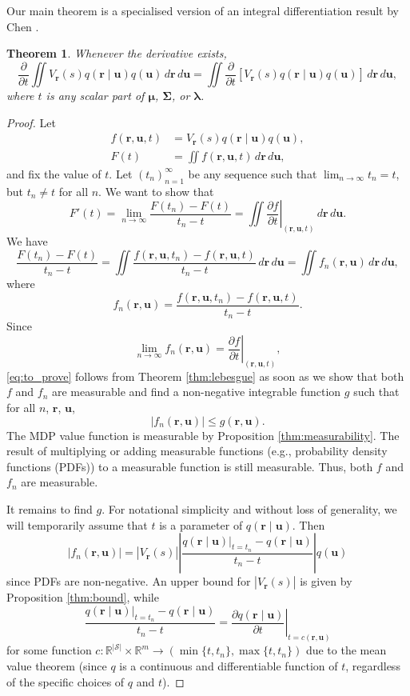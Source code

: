 \documentclass{article}
\newtheorem{theorem}{Theorem}[section]
\theoremstyle{definition}
\theoremstyle{remark}
\newcommand{\V}{V_{\mathbf{r}}}
\newcommand{\dt}{\frac{\partial}{\partial t}}
\newcommand{\f}{f(\mathbf{r}, \mathbf{u}, t)}
\newcommand{\ftn}{f(\mathbf{r}, \mathbf{u}, t_n)}
\newcommand{\fn}{f_n(\mathbf{r}, \mathbf{u})}
\newcommand{\dx}{\,d\mathbf{r}\,d\mathbf{u}}
\newcommand{\df}{\left.\frac{\partial f}{\partial t}\right|_{(\mathbf{r},
    \mathbf{u}, t)}}
\newcommand{\g}{g(\mathbf{r}, \mathbf{u})}
\begin{document}
Our main theorem is a specialised version of an integral differentiation result
by Chen \cite{lecture_notes}.
\begin{theorem} \label{thm:main}
  Whenever the derivative exists,
  \[
    \dt\iint
    \V(s)q(\mathbf{r} \mid \mathbf{u})q(\mathbf{u})\dx
    = \iint
    \dt[\V(s)q(\mathbf{r} \mid \mathbf{u})q(\mathbf{u})]\dx,
  \]
  where $t$ is any scalar part of $\bm\mu$, $\bm\Sigma$, or $\bm\lambda$.
\end{theorem}
\begin{proof}
  Let
  \begin{align*}
    \f &= \V(s)q(\mathbf{r} \mid \mathbf{u})q(\mathbf{u}), \\
    F(t) &= \iint \f\dx,
  \end{align*}
  and fix the value of $t$. Let $(t_n)_{n=1}^\infty$ be any sequence such that
  $\lim_{n \to \infty} t_n = t$, but $t_n \ne t$ for all $n$. We want to show
  that
  \begin{equation} \label{eq:to_prove}
    F'(t) = \lim_{n \to \infty} \frac{F(t_n) - F(t)}{t_n - t} = \iint \df\dx.
  \end{equation}
  We have
  \[
    \frac{F(t_n) - F(t)}{t_n - t} = \iint \frac{\ftn - \f}{t_n - t}\dx =
    \iint \fn\dx,
  \]
  where
  \[
    \fn = \frac{\ftn - \f}{t_n - t}.
  \]
  Since
  \[
    \lim_{n \to \infty} \fn = \df,
  \]
  \eqref{eq:to_prove} follows from Theorem \ref{thm:lebesgue} as soon as we show
  that both $f$ and $f_n$ are measurable and find a non-negative integrable
  function $g$ such that for all $n$, $\mathbf{r}$, $\mathbf{u}$,
  \[
    |\fn| \le \g.
  \]
  The MDP value function is measurable by Proposition \ref{thm:measurability}.
  The result of multiplying or adding measurable functions (e.g., probability
  density functions (PDFs)) to a measurable function is still measurable. Thus,
  both $f$ and $f_n$ are measurable.

  It remains to find $g$. For notational simplicity and without loss of
  generality, we will temporarily assume that $t$ is a parameter of
  $q(\mathbf{r} \mid \mathbf{u})$. Then
  \[
    |\fn| = |\V(s)| \left| \frac{q(\mathbf{r} \mid \mathbf{u})|_{t =
          t_n} - q(\mathbf{r} \mid \mathbf{u})}{t_n - t} \right| q(\mathbf{u})
  \]
  since PDFs are non-negative. An upper bound for
  $|\V(s)|$ is given by Proposition \ref{thm:bound}, while
  \[
    \frac{q(\mathbf{r} \mid \mathbf{u})|_{t = t_n} - q(\mathbf{r} \mid \mathbf{u})}{t_n - t} = \left.
      \frac{\partial q(\mathbf{r} \mid \mathbf{u})}{\partial t} \right|_{t = c(\mathbf{r},
      \mathbf{u})}
  \]
  for some function $c : \mathbb{R}^{|\mathcal{S}|} \times \mathbb{R}^m \to
  (\min\{t, t_n\}, \max\{t, t_n\})$ due to the mean value theorem (since $q$ is
  a continuous and differentiable function of $t$, regardless of the specific
  choices of $q$ and $t$).


\end{proof}
\end{document}

